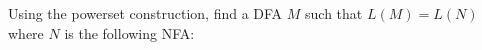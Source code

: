 Using the powerset construction, find a DFA $M$ such that
$L(M) = L(N)$ where $N$ is the following NFA:


